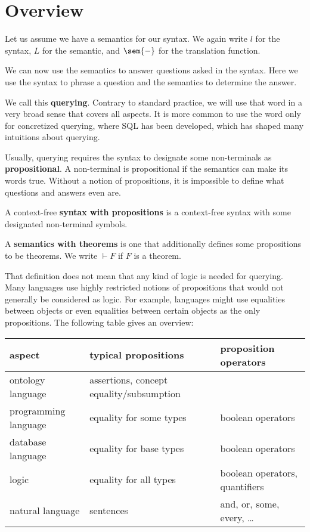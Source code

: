 \section{Overview}

Let us assume we have a semantics for our syntax.
We again write $l$ for the syntax, $L$ for the semantic, and $\sem{-}$ for the translation function.

We can now use the semantics to answer questions asked in the syntax.
Here we use the syntax to phrase a question and the semantics to determine the answer.

We call this \textbf{querying}.
Contrary to standard practice, we will use that word in a very broad sense that covers all aspects.
It is more common to use the word only for concretized querying, where SQL has been developed, which has shaped many intuitions about querying.

Usually, querying requires the syntax to designate some non-terminals as \textbf{propositional}.
A non-terminal is propositional if the semantics can make its words true.
Without a notion of propositions, it is impossible to define what questions and answers even are.

\begin{definition}[Propositions]
A context-free \textbf{syntax with propositions} is a context-free syntax with some designated non-terminal symbols.

A \textbf{semantics with theorems} is one that additionally defines some propositions to be theorems.
We write $\vdash F$ if $F$ is a theorem.
\end{definition}

That definition does not mean that any kind of logic is needed for querying.
Many languages use highly restricted notions of propositions that would not generally be considered as logic.
For example, languages might use equalities between objects or even equalities between certain objects as the only propositions.
The following table gives an overview:

\begin{center}
\begin{tabular}{lll}
\toprule
aspect & typical propositions & proposition operators\\
\midrule
ontology language & assertions, concept equality/subsumption &\\
programming language & equality for some types &  boolean operators\\
database language & equality for base types &  boolean operators \\
logic & equality for all types & boolean operators, quantifiers\\
natural language & sentences & and, or, some, every, \ldots\\
\bottomrule
\end{tabular}
\end{center}

